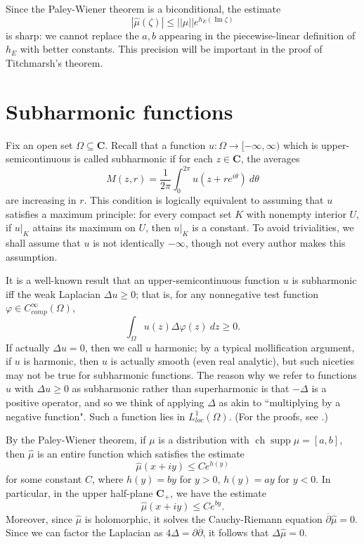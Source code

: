 \documentclass[12pt]{report}
\newcommand{\CC}{\mathbf{C}}
\DeclareMathOperator{\ch}{ch}
\DeclareMathOperator{\supp}{supp}
\newcommand{\dbar}{\overline \partial}
\renewcommand{\Im}{\operatorname{Im}}
\theoremstyle{definition}
\theoremstyle{remark}
\begin{document}
    Since the Paley-Wiener theorem is a biconditional, the estimate
    $$|\hat \mu(\zeta)| \leq ||\mu|| e^{h_E(\Im \zeta)}$$
    is sharp: we cannot replace the $a, b$ appearing in the piecewise-linear definition of $h_E$ with better constants. This precision will be important in the proof of Titchmarsh's theorem.


\section{Subharmonic functions}
Fix an open set $\Omega \subseteq \CC$. Recall that a function $u: \Omega \to [-\infty, \infty)$ which is upper-semicontinuous is called subharmonic if for each $z \in \CC$, the averages
$$M(z, r) = \frac{1}{2\pi} \int_0^{2\pi} u(z + re^{i\theta}) ~d\theta$$
are increasing in $r$. This condition is logically equivalent to assuming that $u$ satisfies a maximum principle: for every compact set $K$ with nonempty interior $U$, if $u|_K$ attains its maximum on $U$, then $u|_K$ is a constant. To avoid trivialities, we shall assume that $u$ is not identically $-\infty$, though not every author makes this assumption.

It is a well-known result that an upper-semicontinuous function $u$ is subharmonic iff the weak Laplacian $\Delta u \geq 0$; that is, for any nonnegative test function $\varphi \in C^\infty_{comp}(\Omega)$,
$$\int_\Omega u(z) \Delta \varphi(z) ~dz \geq 0.$$ If actually $\Delta u = 0$, then we call $u$ harmonic; by a typical mollification argument, if $u$ is harmonic, then $u$ is actually smooth (even real analytic), but such niceties may not be true for subharmonic functions. The reason why we refer to functions $u$ with $\Delta u \geq 0$ as subharmonic rather than superharmonic is that $-\Delta$ is a positive operator, and so we think of applying $\Delta$ as akin to ``multiplying by a negative function". Such a function lies in $L^1_{loc}(\Omega)$. (For the proofs, see \cite[Chapter 1]{hormander1973introduction}.)

By the Paley-Wiener theorem, if $\mu$ is a distribution with $\ch \supp \mu = [a, b]$, then $\hat \mu$ is an entire function which satisfies the estimate
$$\hat \mu(x + iy) \leq Ce^{h(y)}$$
for some constant $C$, where $h(y) = by$ for $y > 0$, $h(y) = ay$ for $y < 0$. In particular, in the upper half-plane $\CC_+$, we have the estimate
$$\hat \mu(x + iy) \leq Ce^{by}.$$
Moreover, since $\hat \mu$ is holomorphic, it solves the Cauchy-Riemann equation $\dbar \hat \mu = 0$. Since we can factor the Laplacian as $4\Delta = \partial \dbar$, it follows that $\Delta \hat \mu = 0$.
\end{document}
